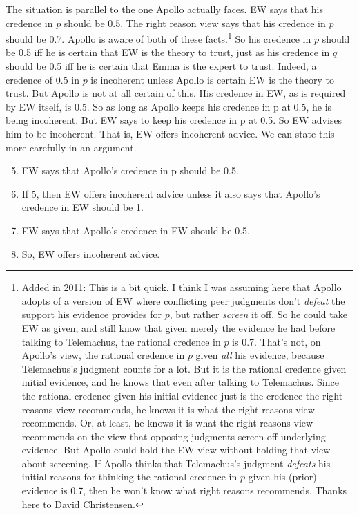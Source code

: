The situation is parallel to the one Apollo actually faces. EW says that his credence in $p$ should be 0.5. The right reason view says that his credence in $p$ should be 0.7. Apollo is aware of both of these facts.\footnote{Added in 2011: This is a bit quick. I think I was assuming here that Apollo adopts of a version of EW where conflicting peer judgments don't \textit{defeat} the support his evidence provides for $p$, but rather \textit{screen} it off. So he could take EW as given, and still know that given merely the evidence he had before talking to Telemachus, the rational credence in $p$ is 0.7. That's not, on Apollo's view, the rational credence in $p$ given \textit{all} his evidence, because Telemachus's judgment counts for a lot. But it is the rational credence given initial evidence, and he knows that even after talking to Telemachus. Since the rational credence given his initial evidence just is the credence the right reasons view recommends, he knows it is what the right reasons view recommends. Or, at least, he knows it is what the right reasons view recommends on the view that opposing judgments screen off underlying evidence. But Apollo could hold the EW view without holding that view about screening. If Apollo thinks that Telemachus's judgment \textit{defeats} his initial reasons for thinking the rational credence in $p$ given his (prior) evidence is 0.7, then he won't know what right reasons recommends. Thanks here to David Christensen.} So his credence in $p$ should be 0.5 iff he is certain that EW is the theory to trust, just as his credence in $q$ should be 0.5 iff he is certain that Emma is the expert to trust. Indeed, a credence of 0.5 in $p$ is incoherent unless Apollo is certain EW is the theory to trust. But Apollo is not at all certain of this. His credence in EW, as is required by EW itself, is 0.5. So as long as Apollo keeps his credence in p at 0.5, he is being incoherent. But EW says to keep his credence in p at 0.5. So EW advises him to be incoherent. That is, EW offers incoherent advice. We can state this more carefully in an argument.

\begin{enumerate}
\setcounter{enumi}{4}
\item EW says that Apollo's credence in p should be 0.5.
\item If 5, then EW offers incoherent advice unless it also says that Apollo's credence in EW should be 1.
\item EW says that Apollo's credence in EW should be 0.5.
\item So, EW offers incoherent advice.
\end{enumerate}


